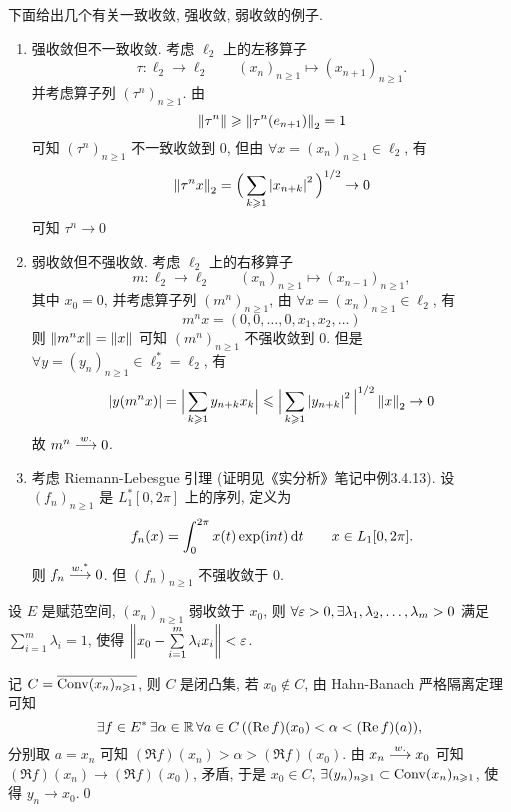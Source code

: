 	\begin{Example}
		下面给出几个有关一致收敛, 强收敛, 弱收敛的例子.
		\begin{enumerate}[(1)]
			\item 强收敛但不一致收敛. 考虑 $ \ell_{2} $ 上的左移算子
			\[
				\tau: \ell_{2}\to\ell_{2}\qquad (x_{n})_{n\geqslant1}\mapsto (x_{n+1})_{n\geqslant1}.
			\]
			并考虑算子列 $ (\tau^{n})_{n\geqslant1} $. 由
			\[
				\norm{\tau^{n}}\geqslant\norm{\tau^{n}(e_{n+1})}_{2}=1
			\]
			可知 $ (\tau^{n})_{n\geqslant1} $ 不一致收敛到 0, 但由 $ \forall x=(x_{n})_{n\geqslant1}\in\ell_{2} $, 有
			\[
				\norm{\tau^{n}x}_{2} = \Big( \sum_{k\geqslant1}\abs{x_{n+k}}^{2} \Big)^{1/2}\to 0
			\]
			可知 $ \tau^{n}\to0 $
			\item  弱收敛但不强收敛. 考虑 $ \ell_{2} $ 上的右移算子
			\[
				m: \ell_{2}\to \ell_{2}\qquad (x_{n})_{n\geqslant1}\mapsto (x_{n-1})_{n\geqslant1},
			\]
			其中 $ x_{0}=0 $, 并考虑算子列 $ (m^{n})_{n\geqslant1} $, 由 $ \forall x=(x_{n})_{n\geqslant1}\in\ell_{2} $, 有
			\[
				m^{n}x=(0, 0, \dots, 0, x_{1}, x_{2}, \dots)
			\]
			则 $ \norm{m^{n}x}=\norm{x} $ 可知 $ (m^{n})_{n\geqslant1} $ 不强收敛到 0. 但是 $ \forall y=(y_{n})_{n\geqslant1}\in\ell_{2}^{*}=\ell_{2} $, 有
			\[
				\abs{y(m^{n}x)}=\Babs{\sum_{k\geqslant1}y_{n+k}x_{k}}\leqslant\Babs{\sum_{k\geqslant1}\abs{y_{n+k}}^{2}}^{1/2}\norm{x}_{2}\to 0
			\] 
			故 $ m^{n}\weakto 0 $.
			\item 考虑 Riemann-Lebesgue 引理 (证明见《实分析》笔记中例3.4.13). 设 $ (f_{n})_{n\geqslant1} $ 是 $ L_{1}^{*}[0, 2\pi] $ 上的序列, 定义为
			\[
				f_{n}(x)=\int_{0}^{2\pi} x(t)\exp(\imag nt)\diff t\qquad x\in L_{1}[0, 2\pi].
			\]
			则 $ f_{n}\sweakto 0 $. 但 $ (f_{n})_{n\geqslant1} $ 不强收敛于 0.
		\end{enumerate}
	\end{Example}
	\begin{Theorem}[Mazur]
		设 $ E $ 是赋范空间, $ (x_{n})_{n\geqslant1} $ 弱收敛于 $ x_{0} $, 则 $ \forall \varepsilon>0, \exists\seq[m]{\lambda}>0 $ 满足 $ \sum\limits_{i=1}^{m}\lambda_{i}=1 $, 使得 $ \norm{x_{0}-\sum\limits_{i=1}^{m}\lambda_{i}x_{i}}<\varepsilon $.
	\end{Theorem}

	\begin{Proof}
		记 $ C = \baro{\conv(x_{n})_{n\geqslant1}} $, 则 $ C $ 是闭凸集, 若 $ x_{0}\notin C $, 由 Hahn-Banach 严格隔离定理可知
		\[
			\exists f\in\Star{E}\,\exists\alpha\in\R\,\forall a\in C\,((\Re f)(x_{0})<\alpha<(\Re f)(a)),
		\]
		分别取 $ a=x_{n} $ 可知 $ (\Re f)(x_{n})>\alpha>(\Re f)(x_{0}) $. 由 $ x_{n}\weakto x_{0} $ 可知 $ (\Re f)(x_{n})\to (\Re f)(x_{0}) $, 矛盾, 于是 $ x_{0}\in C $, $ \exists (y_{n})_{n\geqslant1}\subset\conv(x_{n})_{n\geqslant1} $, 使得 $ y_{n}\to x_{0} $.\qed
	\end{Proof}

